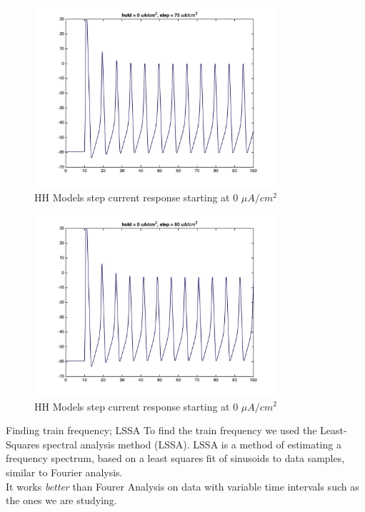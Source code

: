 \documentclass{beamer}
\begin{document}
\begin{frame}
  \begin{figure}
    \centering
    \includegraphics[width = 0.8\textwidth]{./images/current_0_75.jpg}
    \caption{HH Models step current response starting at 0 $\mu A/cm^2$}
  \end{figure}
\end{frame}


\begin{frame}
  \begin{figure}
    \centering
    \includegraphics[width = 0.8\textwidth]{./images/current_0_80.jpg}
    \caption{HH Models step current response starting at 0 $\mu A/cm^2$}
  \end{figure}
\end{frame}

\begin{frame}{Finding train frequency; LSSA}
  To find the train frequency we used the Least-Squares spectral analysis method (LSSA). 
  LSSA is a method of estimating a frequency spectrum, 
based on a least squares fit of sinusoids to data samples, similar to Fourier analysis. \\[0.8cm]
It works \emph{better} than Fourer Analysis on data with variable time intervals such as the ones we are studying.

\end{frame}
\end{document}
